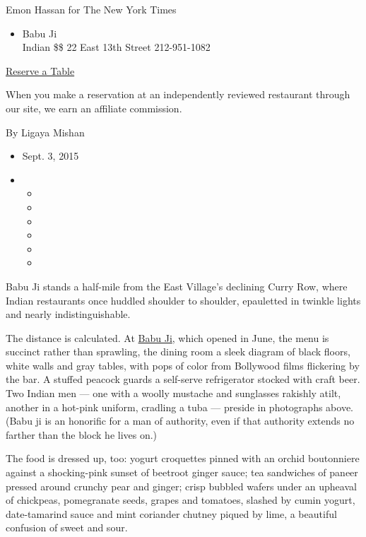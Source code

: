 Emon Hassan for The New York Times

\begin{itemize}
\tightlist
\item
  Babu Ji\\
  Indian \$\$ 22 East 13th Street 212-951-1082
\end{itemize}

\href{https://resy.com/cities/ny/babu-ji?utm_source=nyt\&utm_medium=restoprofile\&utm_campaign=affiliates\&aff_id=c1fe784}{Reserve
a Table}

When you make a reservation at an independently reviewed restaurant
through our site, we earn an affiliate commission.

By Ligaya Mishan

\begin{itemize}
\item
  Sept. 3, 2015
\item
  \begin{itemize}
  \item
  \item
  \item
  \item
  \item
  \item
  \end{itemize}
\end{itemize}

Babu Ji stands a half-mile from the East Village's declining Curry Row,
where Indian restaurants once huddled shoulder to shoulder, epauletted
in twinkle lights and nearly indistinguishable.

The distance is calculated. At \href{http://www.babujinyc.com/}{Babu
Ji}, which opened in June, the menu is succinct rather than sprawling,
the dining room a sleek diagram of black floors, white walls and gray
tables, with pops of color from Bollywood films flickering by the bar. A
stuffed peacock guards a self-serve refrigerator stocked with craft
beer. Two Indian men --- one with a woolly mustache and sunglasses
rakishly atilt, another in a hot-pink uniform, cradling a tuba ---
preside in photographs above. (Babu ji is an honorific for a man of
authority, even if that authority extends no farther than the block he
lives on.)

The food is dressed up, too: yogurt croquettes pinned with an orchid
boutonniere against a shocking-pink sunset of beetroot ginger sauce; tea
sandwiches of paneer pressed around crunchy pear and ginger; crisp
bubbled wafers under an upheaval of chickpeas, pomegranate seeds, grapes
and tomatoes, slashed by cumin yogurt, date-tamarind sauce and mint
coriander chutney piqued by lime, a beautiful confusion of sweet and
sour.

